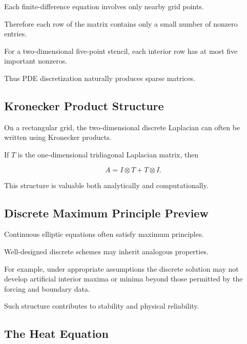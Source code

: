 Each finite-difference equation involves only nearby grid points.

Therefore each row of the matrix contains only a small number of nonzero
entries.

For a two-dimensional five-point stencil, each interior row has at most
five important nonzeros.

Thus PDE discretization naturally produces sparse matrices.

\subsection{Kronecker Product Structure}
\label{subsec:pde-kronecker-structure}

On a rectangular grid, the two-dimensional discrete Laplacian can often be
written using Kronecker products.

If \(T\) is the one-dimensional tridiagonal Laplacian matrix, then

\[
\boxed{
A
=
I\otimes T
+
T\otimes I.
}
\]

This structure is valuable both analytically and computationally.

\subsection{Discrete Maximum Principle Preview}
\label{subsec:discrete-maximum-principle}

Continuous elliptic equations often satisfy maximum principles.

Well-designed discrete schemes may inherit analogous properties.

For example, under appropriate assumptions the discrete solution may not
develop artificial interior maxima or minima beyond those permitted by
the forcing and boundary data.

Such structure contributes to stability and physical reliability.

\subsection{The Heat Equation}
\label{subsec:numerical-heat-equation}


